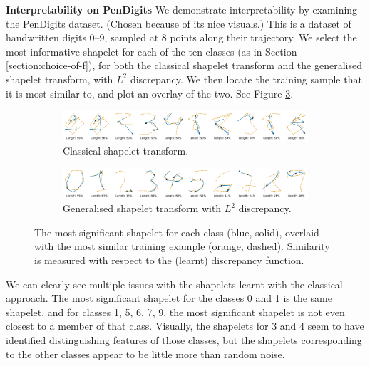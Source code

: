 \documentclass{article}
\theoremstyle{plain}
\theoremstyle{definition}
\newcommand{\boldheading}[1]{

\textbf{#1}\quad}
\begin{document}
\boldheading{Interpretability on PenDigits}
We demonstrate interpretability by examining the PenDigits dataset. (Chosen because of its nice visuals.) This is a dataset of handwritten digits 0--9, sampled at 8 points along their trajectory. We select the most informative shapelet for each of the ten classes (as in Section \ref{section:choice-of-f}), for both the classical shapelet transform and the generalised shapelet transform, with $L^2$ discrepancy. We then locate the training sample that it is most similar to, and plot an overlay of the two. See Figure \ref{fig:pendigits}.

\begin{figure}[t]
    \begin{subfigure}[b]{\linewidth}
        \centering
        \includegraphics[width=\linewidth]{images/old_pendigits.png}
        \caption{Classical shapelet transform.}
        \label{fig:old_shapelets}
    \end{subfigure}
    \begin{subfigure}[b]{\linewidth}
        \centering
        \includegraphics[width=\linewidth]{images/new_pendigits.png}
        \caption{Generalised shapelet transform with $L^2$ discrepancy.}
        \label{fig:new_shapelets}
    \end{subfigure}
    \caption{The most significant shapelet for each class (blue, solid), overlaid with the most similar training example (orange, dashed). Similarity is measured with respect to the (learnt) discrepancy function.}
    \label{fig:pendigits}
\end{figure}

We can clearly see multiple issues with the shapelets learnt with the classical approach. The most significant shapelet for the classes 0 and 1 is the same shapelet, and for classes 1, 5, 6, 7, 9, the most significant shapelet is not even closest to a member of that class. Visually, the shapelets for 3 and 4 seem to have identified distinguishing features of those classes, but the shapelets corresponding to the other classes appear to be little more than random noise.
\end{document}

